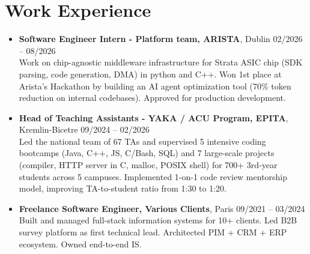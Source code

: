 \documentclass[9pt,a4paper]{article}
\begin{document}
\section*{Work Experience}
\begin{tcolorbox}[mybox]
\begin{itemize}
\item\textbf{Software Engineer Intern - Platform team, ARISTA}, Dublin \hfill {\small02/2026 – 08/2026}\\[0.5em]
\textcolor{gray!40!black}{Work on chip-agnostic middleware infrastructure for Strata ASIC chip (SDK parsing, code generation, DMA) in python and C++. Won 1st place at Arista’s Hackathon by building an AI agent optimization tool (70\% token reduction on internal codebases). Approved for production development.}

\item\textbf{Head of Teaching Assistants - YAKA / ACU Program, EPITA}, Kremlin-Bicetre \hfill {\small09/2024 – 02/2026}\\[0.5em]
\textcolor{gray!40!black}{Led the national team of 67 TAs and supervised 5 intensive coding bootcamps (Java, C++, JS, C/Bash, SQL) and 7 large-scale projects (compiler, HTTP server in C, malloc, POSIX shell) for 700+ 3rd-year students across 5 campuses. Implemented 1-on-1 code review mentorship model, improving TA-to-student ratio from 1:30 to 1:20.}

\item\textbf{Freelance Software Engineer, Various Clients}, Paris \hfill {\small09/2021 – 03/2024}\\[0.5em]
\textcolor{gray!40!black}{Built and managed full-stack information systems for 10+ clients. Led B2B survey platform as first technical lead. Architected PIM + CRM + ERP ecosystem. Owned end-to-end IS.}
\end{itemize}
\end{tcolorbox}
\end{document}
